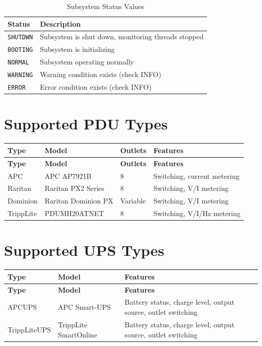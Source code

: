 \begin{table}[h]
    \centering
    \begin{tabular}{ll}
        \toprule
        \textbf{Status} & \textbf{Description} \\
        \midrule
        \texttt{SHUTDWN} & Subsystem is shut down, monitoring threads stopped \\
        \texttt{BOOTING} & Subsystem is initializing \\
        \texttt{NORMAL} & Subsystem operating normally \\
        \texttt{WARNING} & Warning condition exists (check INFO) \\
        \texttt{ERROR} & Error condition exists (check INFO) \\
        \bottomrule
    \end{tabular}
    \caption{Subsystem Status Values}
    \label{tab:status-values}
\end{table}

\section{Supported PDU Types}

\begin{longtable}{p{2.5cm}p{4cm}p{3cm}p{4.5cm}}
    \toprule
    \textbf{Type} & \textbf{Model} & \textbf{Outlets} & \textbf{Features} \\
    \midrule
    \endfirsthead
    \toprule
    \textbf{Type} & \textbf{Model} & \textbf{Outlets} & \textbf{Features} \\
    \midrule
    \endhead
    \bottomrule
    \endfoot

    APC & APC AP7921B & 8 & Switching, current metering \\
    Raritan & Raritan PX2 Series & 8 & Switching, V/I metering \\
    Dominion & Raritan Dominion PX & Variable & Switching, V/I metering \\
    TrippLite & PDUMH20ATNET & 8 & Switching, V/I/Hz metering \\

\end{longtable}

\section{Supported UPS Types}

\begin{longtable}{p{3cm}p{4cm}p{7cm}}
    \toprule
    \textbf{Type} & \textbf{Model} & \textbf{Features} \\
    \midrule
    \endfirsthead
    \toprule
    \textbf{Type} & \textbf{Model} & \textbf{Features} \\
    \midrule
    \endhead
    \bottomrule
    \endfoot

    APCUPS & APC Smart-UPS & Battery status, charge level, output source, outlet switching \\
    TrippLiteUPS & TrippLite SmartOnline & Battery status, charge level, output source, outlet switching \\

\end{longtable}

